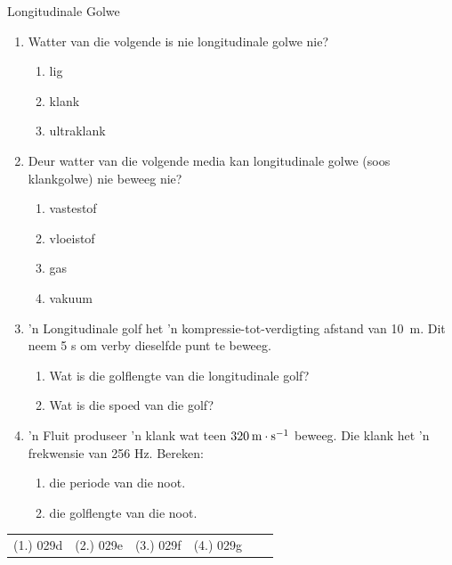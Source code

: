 \begin{eocexercises}{Longitudinale Golwe}
            \nopagebreak
\label{m38783*id293753}\begin{enumerate}[noitemsep, label=\textbf{\arabic*}. ] 
\item Watter van die volgende is nie longitudinale golwe nie?
\begin{enumerate}[noitemsep, label=\textbf{\alph*}. ] 
    \item lig
    \item klank
    \item ultraklank
\end{enumerate}
\item Deur watter van die volgende media kan longitudinale golwe (soos klankgolwe) nie beweeg nie?
\begin{enumerate}[noitemsep, label=\textbf{\alph*}. ] 
    \item vastestof
    \item vloeistof
    \item gas
    \item vakuum
\end{enumerate}

\par
\item 'n Longitudinale golf het 'n kompressie-tot-verdigting afstand van 10~m. Dit neem 5 s om verby dieselfde punt te beweeg.
\begin{enumerate}[noitemsep, label=\textbf{\alph*}. ] 
    \item Wat is die golflengte van die longitudinale golf?
    \item Wat is die spoed van die golf?
\end{enumerate}

\item 'n Fluit produseer 'n klank wat teen $320\phantom{\rule{2pt}{0ex}}\text{m}\ensuremath{\cdot}\text{s}{}^{-1}$ beweeg. Die klank het 'n frekwensie van 256 Hz. Bereken:
\begin{enumerate}[noitemsep, label=\textbf{\alph*}. ] 
    \item die periode van die noot.
    \item die golflengte van die noot.
\end{enumerate}
\end{enumerate}

\par \practiceinfo
\par \begin{tabular}[h]{cccccc}
(1.)	029d	&
(2.)	029e	&
(3.)	029f	&
(4.)	029g	&
\end{tabular}

\end{eocexercises}
